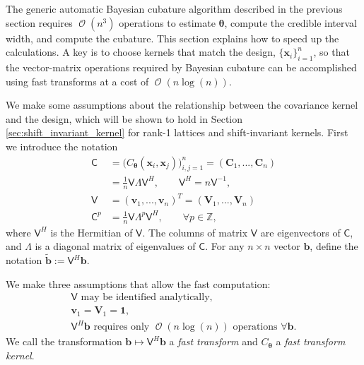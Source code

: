 \documentclass{iitthesis}          %
\DeclareMathOperator{\Order}{{\mathcal O}}
\newcommand{\bm}[1]{\boldsymbol{#1}}
\newcommand{\integers}{\mathbb{Z}}
\newcommand{\vtheta}{{\bm{\theta}}}
\newcommand{\vb}{\bm{b}}
\newcommand{\vC}{\bm{C}}
\newcommand{\vv}{\bm{v}}
\newcommand{\vV}{\bm{V}}
\newcommand{\vx}{\bm{x}}
\newcommand{\vone}{\bm{1}}
\newcommand{\mC}{\mathsf{C}}
\newcommand{\mLambda}{\mathsf{\Lambda}}
\newcommand{\mV}{\mathsf{V}}
\begin{document}
\label{sec:fast_BC}

The generic automatic Bayesian cubature algorithm described in the previous section requires $\Order(n^3)$ operations to estimate $\vtheta$, compute the credible interval width, and compute the cubature.  This section explains how to speed up the calculations. A key is to choose kernels that match the design, $\{\vx_i\}_{i=1}^n$, so that the vector-matrix operations required by Bayesian cubature can be accomplished using fast transforms at a cost of $\Order(n \log(n))$.


We make some assumptions about the relationship between the covariance kernel and the design, which will be shown to hold in Section \ref{sec:shift_invariant_kernel} for rank-1 lattices and shift-invariant kernels.  First we introduce the notation
\begin{align}
\nonumber
\mC &= \Big(C_\vtheta(\vx_i,\vx_j)\Big)_{i,j=1}^n  = (\vC_1,...,\vC_n) 
\\
\label{eqn:ftk_factor}
&= \frac 1n \mV \mLambda \mV^H , 
\quad \quad \mV^H = n \mV^{-1}, \\
\nonumber
\mV &= (\vv_1,...,\vv_n)^T = (\vV_1,...,\vV_n) \\
\nonumber
\mC^p  &= \frac 1n \mV \mLambda^{p} \mV^H, \qquad \forall p \in \integers,
\end{align}
where $\mV^H$ is the Hermitian of $\mV$.  The columns of matrix $\mV$ are eigenvectors of $\mC$, and $\mLambda$ is a diagonal matrix of eigenvalues of $\mC$.
For any $n \times n$ vector $\vb$, define the notation  $\widetilde{\vb} := \mV^H \vb$.

We make three assumptions that allow the fast computation:
\begin{subequations} \label{fastcompAssump}
	\begin{gather}
	\label{fastcompAssumpA}
	\mV \text{ may be identified analytically}, \\
	\label{fastcompAssumpB}
	\vv_1 = \vV_1 = \vone, \\
	\label{fastcompAssumpC}
	\mV^H \vb  \text{ requires only $\Order(n \log(n))$ operations } \forall \vb.
	\end{gather}
\end{subequations}
We call the transformation $\vb \mapsto \mV^H \vb$ a \emph{fast transform} and $C_\vtheta$ a \emph{fast transform kernel}.  
\end{document}
